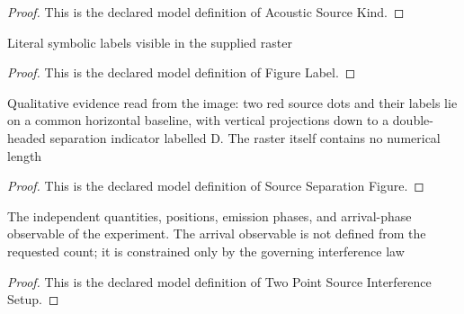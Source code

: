 \begin{proof}
  This is the declared model definition of Acoustic Source Kind.
\end{proof}
\begin{definition}
  \label{def:physics:phyx-mini-0312:phyxminiproblems-problemphyxmini0312-figurelabel}
  Literal symbolic labels visible in the supplied raster
\end{definition}
\begin{proof}
  This is the declared model definition of Figure Label.
\end{proof}
\begin{definition}
  \label{def:physics:phyx-mini-0312:phyxminiproblems-problemphyxmini0312-sourceseparationfigure}
  Qualitative evidence read from the image: two red source dots and their labels lie on a common horizontal baseline, with vertical projections down to a double-headed separation indicator labelled D. The raster itself contains no numerical length
\end{definition}
\begin{proof}
  This is the declared model definition of Source Separation Figure.
\end{proof}
\begin{definition}
  \label{def:physics:phyx-mini-0312:phyxminiproblems-problemphyxmini0312-twopointsourceinterferencesetup}
  The independent quantities, positions, emission phases, and arrival-phase observable of the experiment. The arrival observable is not defined from the requested count; it is constrained only by the governing interference law
\end{definition}
\begin{proof}
  This is the declared model definition of Two Point Source Interference Setup.
\end{proof}
